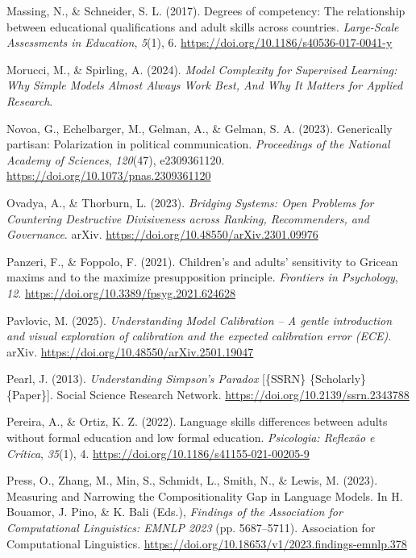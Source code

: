 \documentclass[
  12pt,
]{article}
\newlength{\cslhangindent}
\newenvironment{CSLReferences}[2] %
 {\begin{list}{}{%
  \setlength{\itemindent}{0pt}
  \setlength{\leftmargin}{0pt}
  \setlength{\parsep}{0pt}
  \ifodd #1
   \setlength{\leftmargin}{\cslhangindent}
   \setlength{\itemindent}{-1\cslhangindent}
  \fi
  \setlength{\itemsep}{#2\baselineskip}}}
 {\end{list}}
\begin{document}
\begin{CSLReferences}{1}{0}
Massing, N., \& Schneider, S. L. (2017). Degrees of competency: The relationship between educational qualifications and adult skills across countries. \emph{Large-Scale Assessments in Education}, \emph{5}(1), 6. \url{https://doi.org/10.1186/s40536-017-0041-y}

Morucci, M., \& Spirling, A. (2024). \emph{Model {Complexity} for {Supervised} {Learning}: {Why} {Simple} {Models} {Almost} {Always} {Work} {Best}, {And} {Why} {It} {Matters} for {Applied} {Research}}.

Novoa, G., Echelbarger, M., Gelman, A., \& Gelman, S. A. (2023). Generically partisan: {Polarization} in political communication. \emph{Proceedings of the National Academy of Sciences}, \emph{120}(47), e2309361120. \url{https://doi.org/10.1073/pnas.2309361120}

Ovadya, A., \& Thorburn, L. (2023). \emph{Bridging {Systems}: {Open} {Problems} for {Countering} {Destructive} {Divisiveness} across {Ranking}, {Recommenders}, and {Governance}}. arXiv. \url{https://doi.org/10.48550/arXiv.2301.09976}

Panzeri, F., \& Foppolo, F. (2021). Children's and adults' sensitivity to {Gricean} maxims and to the maximize presupposition principle. \emph{Frontiers in Psychology}, \emph{12}. \url{https://doi.org/10.3389/fpsyg.2021.624628}

Pavlovic, M. (2025). \emph{Understanding {Model} {Calibration} -- {A} gentle introduction and visual exploration of calibration and the expected calibration error ({ECE})}. arXiv. \url{https://doi.org/10.48550/arXiv.2501.19047}

Pearl, J. (2013). \emph{Understanding {Simpson}'s {Paradox}} {[}\{SSRN\} \{Scholarly\} \{Paper\}{]}. Social Science Research Network. \url{https://doi.org/10.2139/ssrn.2343788}

Pereira, A., \& Ortiz, K. Z. (2022). Language skills differences between adults without formal education and low formal education. \emph{Psicologia: Reflexão e Crítica}, \emph{35}(1), 4. \url{https://doi.org/10.1186/s41155-021-00205-9}

Press, O., Zhang, M., Min, S., Schmidt, L., Smith, N., \& Lewis, M. (2023). Measuring and {Narrowing} the {Compositionality} {Gap} in {Language} {Models}. In H. Bouamor, J. Pino, \& K. Bali (Eds.), \emph{Findings of the {Association} for {Computational} {Linguistics}: {EMNLP} 2023} (pp. 5687--5711). Association for Computational Linguistics. \url{https://doi.org/10.18653/v1/2023.findings-emnlp.378}


\end{CSLReferences}
\end{document}
